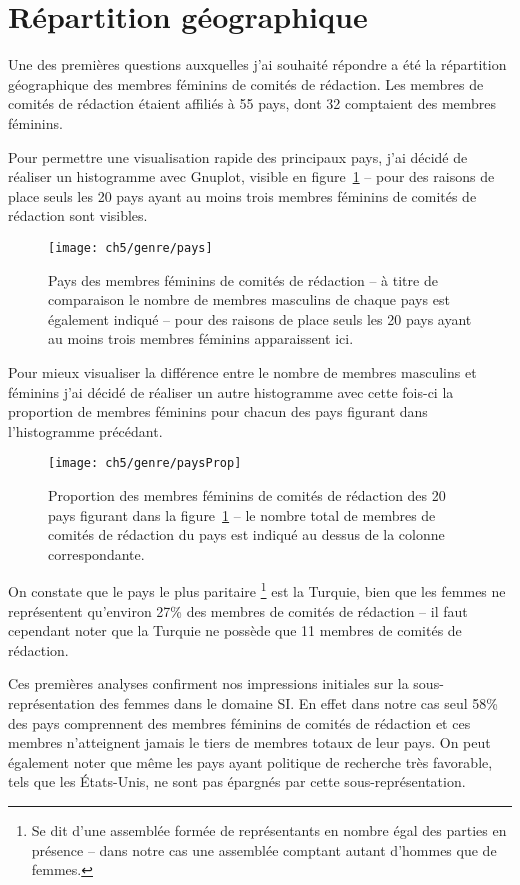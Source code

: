 	
	\section{Répartition géographique}
		Une des premières questions auxquelles j'ai souhaité répondre a été la répartition géographique des membres féminins de comités de rédaction. Les membres de comités de rédaction étaient affiliés à 55 pays, dont 32 comptaient des membres féminins.
		
		Pour permettre une visualisation rapide des principaux pays, j’ai décidé de réaliser un histogramme avec Gnuplot, visible en figure~\ref{fig:pays} -- pour des raisons de place seuls les  20 pays ayant au moins trois membres féminins de comités de rédaction sont visibles.
			
		\begin{figure}[p]
			\centering
			\texttt{[image: ch5/genre/pays]}
			\caption{Pays des membres féminins de comités de rédaction -- à titre de
comparaison le nombre de membres masculins de chaque pays est également indiqué -- pour des raisons de place seuls les 20 pays ayant au moins trois membres féminins apparaissent ici.}\label{fig:pays}
		\end{figure}
			
		Pour mieux visualiser la différence entre le nombre de membres masculins et féminins j’ai décidé de réaliser un autre histogramme avec cette fois-ci la proportion de membres féminins pour chacun des pays figurant dans l’histogramme précédant.
			
		\begin{figure}[p]
			\centering
			\texttt{[image: ch5/genre/paysProp]}
			\caption{Proportion des membres féminins de comités de rédaction des 20
pays figurant dans la figure~\ref{fig:pays} -- le nombre total de membres de comités de rédaction du pays est indiqué au dessus de la colonne correspondante.}\label{fig:paysProp}
		\end{figure}
		
		On constate que le pays le plus paritaire \footnote{Se dit d’une assemblée formée de représentants en nombre égal des parties en présence -- dans notre cas une assemblée comptant autant d’hommes que de femmes.} est la Turquie, bien que les femmes ne représentent qu’environ 27\% des membres de comités de rédaction -- il faut cependant noter que la Turquie ne possède que 11 membres de comités de rédaction.
			
		Ces premières analyses confirment nos impressions initiales sur la sous-représentation des femmes dans le domaine SI. En effet dans notre cas seul 58\% des pays comprennent des membres féminins de comités de rédaction et ces membres n'atteignent jamais le tiers de membres totaux de leur pays. On peut également noter que même les pays ayant politique de recherche très favorable, tels que les États-Unis, ne sont pas épargnés par cette sous-représentation.


